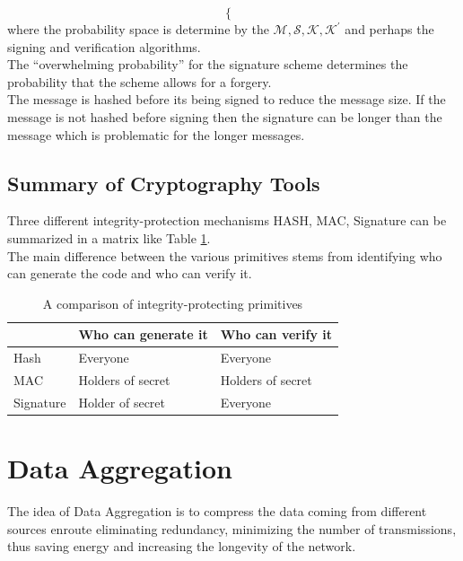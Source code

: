 \documentclass[%
  slidesonly,%
  semlayer%
  ]{seminar}                                  %
\begin{document}
\begin{slide}
\begin{equation}
\begin{cases}
      \end{cases}
      \label{eq:verification}
    \end{equation}
    where the probability space is determine by the $\mathcal {M, S, K, K^{'}}$ and perhaps the signing and verification algorithms.\\
    The ``overwhelming probability'' for the signature scheme determines the probability that the scheme allows for a forgery.\\
    The message is hashed before its being signed to reduce the message size. 
    If the message is not hashed before signing then the signature can be longer than the message which is problematic for the longer messages.
    \clearpage

  \subsection*{Summary of Cryptography Tools}
    Three different integrity-protection mechanisms HASH, MAC, Signature can be summarized in a matrix like Table \ref{table:summary}.\\
    The main difference between the various primitives stems from identifying who can generate the code and who can verify it.
    \begin{table}[!htb] 
      \begin{center}
        \begin{tabular}{ |l || l| l| }
          \hline
           & Who can generate it & Who can verify it \\
          \hline
          \hline
          Hash & Everyone & Everyone \\ 
          \hline
          MAC & Holders of secret & Holders of secret \\
          \hline
          Signature & Holder of secret & Everyone \\
          \hline
        \end{tabular}
      \end{center}
      \caption{A comparison of integrity-protecting primitives}
      \label{table:summary}
    \end{table}
    \clearpage

\section*{Data Aggregation}

  The idea of Data Aggregation is to compress the data coming from different sources enroute eliminating redundancy, minimizing the number of transmissions, thus saving energy and increasing the longevity of the network.


\end{slide}
\end{document}
